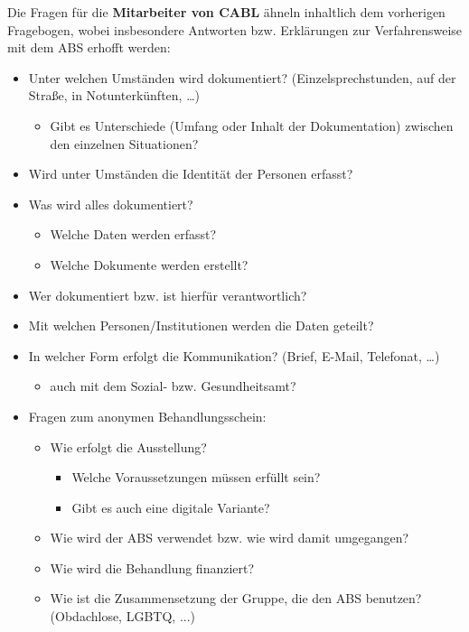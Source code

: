 Die Fragen für die \textbf{Mitarbeiter von CABL} ähneln inhaltlich dem vorherigen Fragebogen, wobei insbesondere Antworten bzw. Erklärungen zur Verfahrensweise mit dem ABS erhofft werden:

\begin{itemize}
	\item Unter welchen Umständen wird dokumentiert? (Einzelsprechstunden, auf der Straße, in Notunterkünften, …)
	\begin{itemize}
		\item Gibt es Unterschiede (Umfang oder Inhalt der Dokumentation) zwischen den einzelnen Situationen?
	\end{itemize}
	\item Wird unter Umständen die Identität der Personen erfasst?
	\item Was wird alles dokumentiert?
	\begin{itemize}
		\item Welche Daten werden erfasst?
		\item Welche Dokumente werden erstellt?
	\end{itemize}
	\item Wer dokumentiert bzw. ist hierfür verantwortlich?
	\item Mit welchen Personen/Institutionen werden die Daten geteilt?
	\item In welcher Form erfolgt die Kommunikation? (Brief, E-Mail, Telefonat, …)
	\begin{itemize}
		\item auch mit dem Sozial- bzw. Gesundheitsamt?
	\end{itemize}
	\item Fragen zum anonymen Behandlungsschein:
	\begin{itemize}
		\item Wie erfolgt die Ausstellung?
		\begin{itemize}
			\item Welche Voraussetzungen müssen erfüllt sein?
			\item Gibt es auch eine digitale Variante?
		\end{itemize}
		\item Wie wird der ABS verwendet bzw. wie wird damit umgegangen?
		\item Wie wird die Behandlung finanziert?
		\item Wie ist die Zusammensetzung der Gruppe, die den ABS benutzen? (Obdachlose, LGBTQ, ...)
	\end{itemize}	
\end{itemize}

